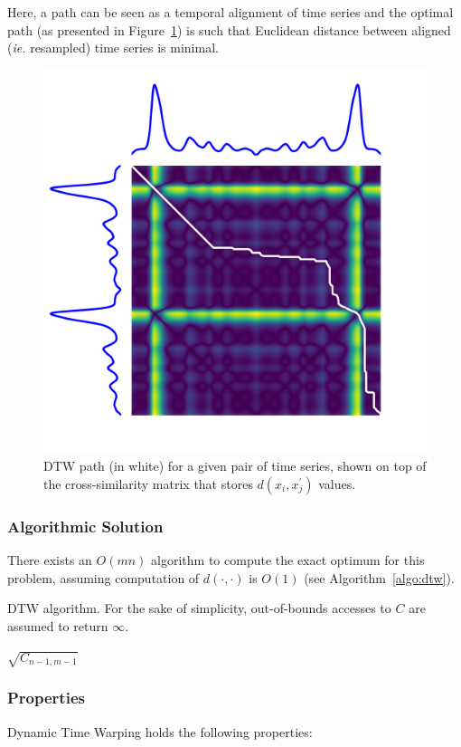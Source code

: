 Here, a path can be seen as a temporal alignment of time series and the optimal
path (as presented in Figure~\ref{fig:dtw}) is such that
Euclidean distance between aligned (\emph{ie.} resampled) time series is
minimal.

\begin{figure}[t]
\centering
\includegraphics[width=.4\textwidth]{fig/dtw}
\caption{DTW path (in white) for a given pair of time
series, shown on top of the cross-similarity matrix that stores
$d(x_i, {x}^\prime_j)$
values. \label{fig:dtw}}
\end{figure}

\subsubsection{Algorithmic Solution}

There exists an $O(mn)$ algorithm to compute the exact optimum for this
problem, assuming computation of $d(\cdot,\cdot)$ is $O(1)$
(see Algorithm~\ref{algo:dtw}).

\begin{algorithm}[t]
 \caption{DTW algorithm. For the sake of simplicity, out-of-bounds accesses to $C$ are assumed to return $\infty$.}
 \label{algo:dtw}
  \Return $\sqrt{C_{n - 1, m - 1}}$
\end{algorithm}


\subsubsection{Properties}

Dynamic Time Warping holds the following properties:

